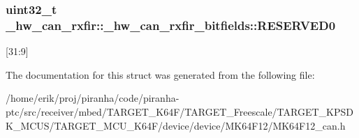 \subsubsection[{\texorpdfstring{R\+E\+S\+E\+R\+V\+E\+D0}{RESERVED0}}]{\setlength{\rightskip}{0pt plus 5cm}uint32\+\_\+t \+\_\+hw\+\_\+can\+\_\+rxfir\+::\+\_\+hw\+\_\+can\+\_\+rxfir\+\_\+bitfields\+::\+R\+E\+S\+E\+R\+V\+E\+D0}\hypertarget{struct__hw__can__rxfir_1_1__hw__can__rxfir__bitfields_a785dc57554ca5fef23014add10eeaf10}{}\label{struct__hw__can__rxfir_1_1__hw__can__rxfir__bitfields_a785dc57554ca5fef23014add10eeaf10}
\mbox{[}31\+:9\mbox{]} 

The documentation for this struct was generated from the following file\+:\begin{DoxyCompactItemize}
\item 
/home/erik/proj/piranha/code/piranha-\/ptc/src/receiver/mbed/\+T\+A\+R\+G\+E\+T\+\_\+\+K64\+F/\+T\+A\+R\+G\+E\+T\+\_\+\+Freescale/\+T\+A\+R\+G\+E\+T\+\_\+\+K\+P\+S\+D\+K\+\_\+\+M\+C\+U\+S/\+T\+A\+R\+G\+E\+T\+\_\+\+M\+C\+U\+\_\+\+K64\+F/device/device/\+M\+K64\+F12/M\+K64\+F12\+\_\+can.\+h\end{DoxyCompactItemize}
